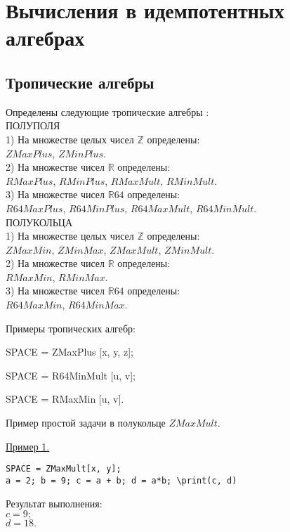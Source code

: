 \chapter{Вычисления в идемпотентных алгебрах}


\section{Тропические алгебры}
Определены следующие тропические алгебры :\\

ПОЛУПОЛЯ\\
1) На множестве целых чисел ${\mathbb Z}$ определены:\\ 
$ZMaxPlus$,  
$ZMinPlus$.\\
2) На множестве чисел ${\mathbb R}$ определены:\\
$RMaxPlus$, 
$RMinPlus$,  
$RMaxMult$,  
$RMinMult$.\\
3) На множестве чисел ${\mathbb R}64$ определены:\\
$R64MaxPlus$, 
$R64MinPlus$,  
$R64MaxMult$,  
$R64MinMult$.\\

ПОЛУКОЛЬЦА\\
1) На множестве целых чисел ${\mathbb Z}$ определены:\\ 
$ZMaxMin$,
$ZMinMax$,
$ZMaxMult$,
$ZMinMult$.\\
2) На множестве чисел ${\mathbb R}$ определены:\\
$RMaxMin$, 
$RMinMax$.\\
3) На множестве чисел ${\mathbb R}64$ определены:\\
$R64MaxMin$, 
$R64MinMax$.

 

Примеры тропических алгебр: 

SPACE = ZMaxPlus [x,  y,  z]; 

SPACE = R64MinMult [u,  v];  

SPACE = RMaxMin [u,  v]. 

 Пример простой задачи в полукольце $ZMaxMult$.
\smallskip

\underline{Пример 1. }

\vspace*{-3mm}
\begin{verbatim}
SPACE = ZMaxMult[x, y];
a = 2; b = 9; c = a + b; d = a*b; \print(c, d)
\end{verbatim}

Результат выполнения:\\
$c = 9; $\\
$d = 18.$

